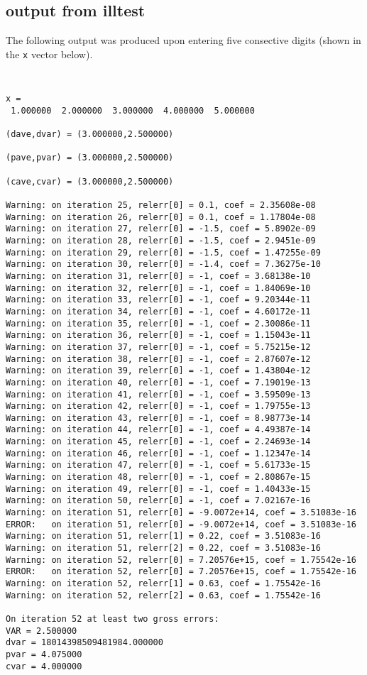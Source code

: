 \documentclass{article}
\begin{document}
\subsection{output from illtest}
\label{sec:illout}
The following output was produced upon entering five consective
digits (shown in the {\tt x} vector below).
{\tt
\begin{verbatim}
x = 
 1.000000  2.000000  3.000000  4.000000  5.000000 

(dave,dvar) = (3.000000,2.500000)

(pave,pvar) = (3.000000,2.500000)

(cave,cvar) = (3.000000,2.500000)

Warning: on iteration 25, relerr[0] = 0.1, coef = 2.35608e-08
Warning: on iteration 26, relerr[0] = 0.1, coef = 1.17804e-08
Warning: on iteration 27, relerr[0] = -1.5, coef = 5.8902e-09
Warning: on iteration 28, relerr[0] = -1.5, coef = 2.9451e-09
Warning: on iteration 29, relerr[0] = -1.5, coef = 1.47255e-09
Warning: on iteration 30, relerr[0] = -1.4, coef = 7.36275e-10
Warning: on iteration 31, relerr[0] = -1, coef = 3.68138e-10
Warning: on iteration 32, relerr[0] = -1, coef = 1.84069e-10
Warning: on iteration 33, relerr[0] = -1, coef = 9.20344e-11
Warning: on iteration 34, relerr[0] = -1, coef = 4.60172e-11
Warning: on iteration 35, relerr[0] = -1, coef = 2.30086e-11
Warning: on iteration 36, relerr[0] = -1, coef = 1.15043e-11
Warning: on iteration 37, relerr[0] = -1, coef = 5.75215e-12
Warning: on iteration 38, relerr[0] = -1, coef = 2.87607e-12
Warning: on iteration 39, relerr[0] = -1, coef = 1.43804e-12
Warning: on iteration 40, relerr[0] = -1, coef = 7.19019e-13
Warning: on iteration 41, relerr[0] = -1, coef = 3.59509e-13
Warning: on iteration 42, relerr[0] = -1, coef = 1.79755e-13
Warning: on iteration 43, relerr[0] = -1, coef = 8.98773e-14
Warning: on iteration 44, relerr[0] = -1, coef = 4.49387e-14
Warning: on iteration 45, relerr[0] = -1, coef = 2.24693e-14
Warning: on iteration 46, relerr[0] = -1, coef = 1.12347e-14
Warning: on iteration 47, relerr[0] = -1, coef = 5.61733e-15
Warning: on iteration 48, relerr[0] = -1, coef = 2.80867e-15
Warning: on iteration 49, relerr[0] = -1, coef = 1.40433e-15
Warning: on iteration 50, relerr[0] = -1, coef = 7.02167e-16
Warning: on iteration 51, relerr[0] = -9.0072e+14, coef = 3.51083e-16
ERROR:   on iteration 51, relerr[0] = -9.0072e+14, coef = 3.51083e-16
Warning: on iteration 51, relerr[1] = 0.22, coef = 3.51083e-16
Warning: on iteration 51, relerr[2] = 0.22, coef = 3.51083e-16
Warning: on iteration 52, relerr[0] = 7.20576e+15, coef = 1.75542e-16
ERROR:   on iteration 52, relerr[0] = 7.20576e+15, coef = 1.75542e-16
Warning: on iteration 52, relerr[1] = 0.63, coef = 1.75542e-16
Warning: on iteration 52, relerr[2] = 0.63, coef = 1.75542e-16

On iteration 52 at least two gross errors:
VAR = 2.500000 
dvar = 18014398509481984.000000 
pvar = 4.075000 
cvar = 4.000000
\end{verbatim} 
}
\end{document}
